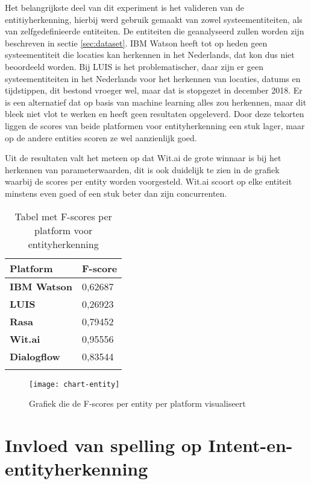 Het belangrijkste deel van dit experiment is het valideren van de entitiyherkenning, hierbij werd gebruik gemaakt van zowel systeementiteiten, als van zelfgedefinieerde entiteiten. De entiteiten die geanalyseerd zullen worden zijn beschreven in sectie \ref{sec:dataset}. IBM Watson heeft tot op heden geen systeementiteit die locaties kan herkennen in het Nederlands, dat kon dus niet beoordeeld worden. Bij LUIS is het problematischer, daar zijn er geen systeementiteiten in het Nederlands voor het herkennen van locaties, datums en tijdstippen, dit bestond vroeger wel, maar dat is stopgezet in december 2018. Er is een alternatief dat op basis van machine learning alles zou herkennen, maar dit bleek niet vlot te werken en heeft geen resultaten opgeleverd. Door deze tekorten liggen de scores van beide platformen voor entityherkenning een stuk lager, maar op de andere entities scoren ze wel aanzienlijk goed. 

Uit de resultaten valt het meteen op dat Wit.ai de grote winnaar is bij het herkennen van parameterwaarden, dit is ook duidelijk te zien in de grafiek waarbij de scores per entity worden voorgesteld. Wit.ai scoort op elke entiteit minstens even goed of een stuk beter dan zijn concurrenten.

\begin{center}
    \begin{longtable}{| l | l |}
        \hline
        \textbf{Platform} & \textbf{F-score} \\ \hline
        \textbf{IBM Watson} & 0,62687 \\ \hline  
        \textbf{LUIS} & 0,26923 \\ \hline  
        \textbf{Rasa} & 0,79452 \\ \hline  
        \textbf{Wit.ai} & 0,95556  \\ \hline  
        \textbf{Dialogflow} & 0,83544 \\ \hline  
        \caption{Tabel met F-scores per platform voor entityherkenning}                                    
    \end{longtable}
    \label{tbl:results-entity}
\end{center}

\begin{figure}[H]
    \label{fig:chart-entity}
    \centering
    \texttt{[image: chart-entity]}
    \caption{Grafiek die de F-scores per entity per platform visualiseert}
\end{figure}

\section{Invloed van spelling op Intent-en-entityherkenning}

